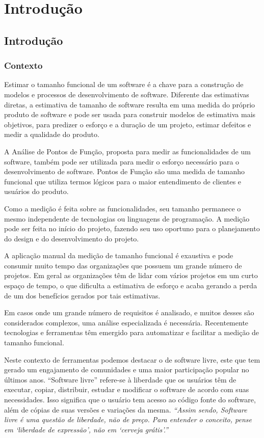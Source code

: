 \part{Introdução}

\chapter[Introdução]{Introdução}

\section{Contexto}

Estimar o tamanho funcional de um software é a chave para a construção de modelos e processos de desenvolvimento de software. Diferente das estimativas diretas, a estimativa de tamanho de software resulta em uma medida do próprio produto de software e pode ser usada para construir modelos de estimativa mais objetivos, para predizer o esforço e a duração de um projeto, estimar defeitos e medir a qualidade do produto. \cite{Ebert:2014}

A Análise de Pontos de Função, proposta para medir as funcionalidades de um software, também pode ser utilizada para medir o esforço necessário para o desenvolvimento de software. Pontos de Função são uma medida de tamanho funcional que utiliza termos lógicos para o maior entendimento de clientes e usuários do produto. \cite{Albrecht:1994}

Como a medição é feita sobre as funcionalidades, seu tamanho permanece o mesmo independente de tecnologias ou linguagens de programação. A medição pode ser feita no início do projeto, fazendo seu uso oportuno para o planejamento do design e do desenvolvimento do projeto. \cite{Kusumoto:2002}

A aplicação manual da medição de tamanho funcional é exaustiva e pode consumir muito tempo das organizações que possuem um grande número de projetos. Em geral as organizações têm de lidar com vários projetos em um curto espaço de tempo, o que dificulta a estimativa de esforço e acaba gerando a perda de um dos benefícios gerados por tais estimativas. \cite{Ebert:2014}

Em casos onde um grande número de requisitos é analisado, e muitos desses são considerados complexos, uma análise especializada é necessária. Recentemente tecnologias e ferramentas têm emergido para automatizar e facilitar a medição de tamanho funcional. \cite{Ebert:2014}

Neste contexto de ferramentas podemos destacar o de software livre, este que tem gerado um engajamento de comunidades e uma maior participação popular no últimos anos. \cite{Eilola:2002} \nocite{Anota:2016} ``Software livre''  refere-se à liberdade que os usuários têm de executar, copiar, distribuir, estudar e modificar o software de acordo com suas necessidades. Isso significa que o usuário tem acesso ao código fonte do software, além de cópias de suas versões e variações da mesma. \cite{Stallman:2003}{\textit{``Assim sendo, Software livre é uma questão de liberdade, não de preço. Para entender o conceito, pense em `liberdade de expressão', não em `cerveja grátis'.''}} \cite{Stallman:2003}

